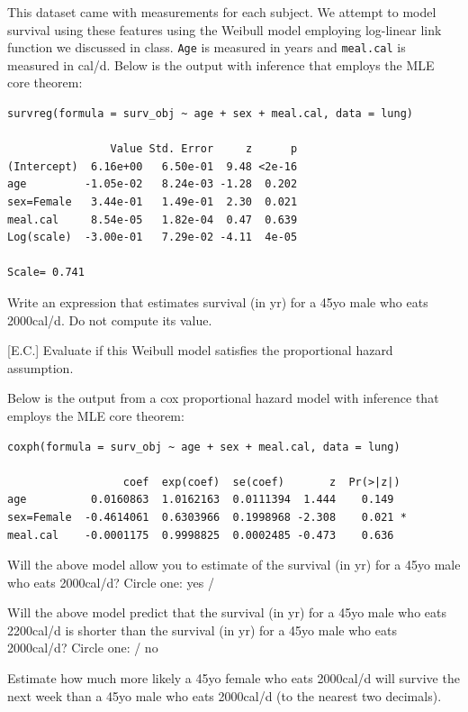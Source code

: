 \documentclass[12pt]{article}
\begin{document}
\noindent This dataset came with measurements for each subject. We attempt to model survival using these features using the Weibull model employing log-linear link function we discussed in class. \texttt{Age} is measured in years and \texttt{meal.cal} is measured in cal/d.  Below is the output with inference that employs the MLE core theorem:

\begin{Verbatim}
survreg(formula = surv_obj ~ age + sex + meal.cal, data = lung)

                Value Std. Error     z      p
(Intercept)  6.16e+00   6.50e-01  9.48 <2e-16
age         -1.05e-02   8.24e-03 -1.28  0.202
sex=Female   3.44e-01   1.49e-01  2.30  0.021
meal.cal     8.54e-05   1.82e-04  0.47  0.639
Log(scale)  -3.00e-01   7.29e-02 -4.11  4e-05

Scale= 0.741 
\end{Verbatim}


\begin{enumerate}

 Write an expression that estimates survival (in yr) for a 45yo male who eats 2000cal/d. Do not compute its value. 


\pagebreak
{} [E.C.] Evaluate if this Weibull model satisfies the proportional hazard assumption.



Below is the output from a cox proportional hazard model with inference that employs the MLE core theorem:

\begin{Verbatim}
coxph(formula = surv_obj ~ age + sex + meal.cal, data = lung)

                  coef  exp(coef)  se(coef)       z  Pr(>|z|)  
age          0.0160863  1.0162163  0.0111394  1.444    0.149  
sex=Female  -0.4614061  0.6303966  0.1998968 -2.308    0.021 *
meal.cal    -0.0001175  0.9998825  0.0002485 -0.473    0.636 
\end{Verbatim}


 Will the above model allow you to estimate of the survival (in yr) for a 45yo male who eats 2000cal/d? Circle one: yes /   

 Will the above model predict that the survival (in yr) for a 45yo male who eats 2200cal/d is shorter than the survival (in yr) for a 45yo male who eats 2000cal/d? Circle one:  / no  


 Estimate how much more likely a 45yo female who eats 2000cal/d will survive the next week than a 45yo male who eats 2000cal/d (to the nearest two decimals). \\

\end{enumerate}
\end{document}
